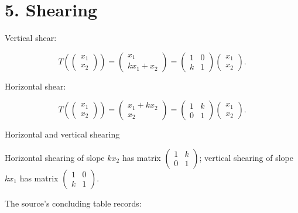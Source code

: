\section{5. Shearing}

Vertical shear:

\[T\left( \begin{pmatrix}
x_{1} \\
x_{2}
\end{pmatrix} \right) = \begin{pmatrix}
x_{1} \\
{kx_{1} + x_{2}}
\end{pmatrix} = \begin{pmatrix}
1 & 0 \\
k & 1
\end{pmatrix}\begin{pmatrix}
x_{1} \\
x_{2}
\end{pmatrix}.\]

Horizontal shear:

\[T\left( \begin{pmatrix}
x_{1} \\
x_{2}
\end{pmatrix} \right) = \begin{pmatrix}
{x_{1} + kx_{2}} \\
x_{2}
\end{pmatrix} = \begin{pmatrix}
1 & k \\
0 & 1
\end{pmatrix}\begin{pmatrix}
x_{1} \\
x_{2}
\end{pmatrix}.\]

\begin{theorem}{Horizontal and vertical shearing}

Horizontal shearing of slope \(kx_{2}\) has matrix \(\begin{pmatrix}
1 & k \\
0 & 1
\end{pmatrix}\); vertical shearing of slope \(kx_{1}\) has matrix \(\begin{pmatrix}
1 & 0 \\
k & 1
\end{pmatrix}\).

\end{theorem}

The source's concluding table records:


